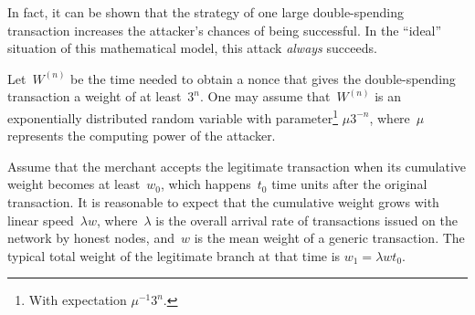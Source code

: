 \documentclass[12pt]{article}
\begin{document}
In fact, it can be shown that the strategy of one large double-spending 
transaction increases the attacker's chances of being successful. 
In the ``ideal'' situation of this mathematical model, this attack
\emph{always} succeeds. 

Let~$W^{(n)}$ be the time needed to obtain a nonce that 
gives the double-spending transaction a weight of at
 least~$3^n$.
One may assume that~$W^{(n)}$ is an exponentially distributed
random variable with parameter\footnote{With 
expectation $\mu^{-1}3^n$.} $\mu 3^{-n}$, where~$\mu$ represents the computing 
power of the attacker. 

Assume that the merchant 
accepts the legitimate transaction when its cumulative 
weight becomes at least~$w_0$, which happens~$t_0$
time units after the original transaction. It is reasonable
to expect that the cumulative weight grows with linear
speed~$\lambda w$, where~$\lambda$ is the overall arrival rate
of transactions issued on the network by honest nodes,
 and~$w$ is the mean weight
of a generic transaction. The typical total weight of the legitimate 
branch at that time is $w_1=\lambda w t_0$.
\end{document}

